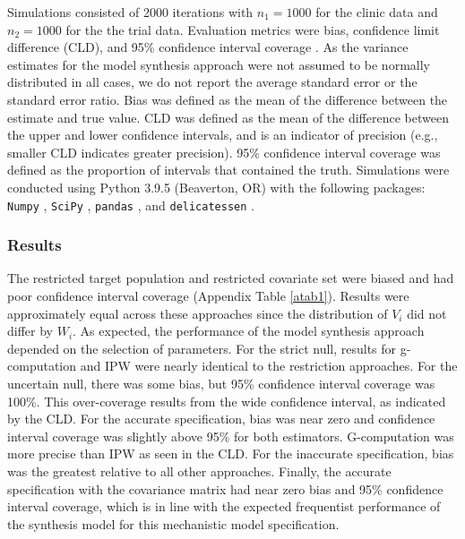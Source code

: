 \documentclass[]{article}
\begin{document}
Simulations consisted of 2000 iterations with $n_1 = 1000$ for the clinic data and $n_2 = 1000$ for the the trial data. Evaluation metrics were bias, confidence limit difference (CLD), and 95\% confidence interval coverage \cite{morris_using_2019}. As the variance estimates for the model synthesis approach were not assumed to be normally distributed in all cases, we do not report the average standard error or the standard error ratio. Bias was defined as the mean of the difference between the estimate and true value. CLD was defined as the mean of the difference between the upper and lower confidence intervals, and is an indicator of precision (e.g., smaller CLD indicates greater precision). 95\% confidence interval coverage was defined as the proportion of intervals that contained the truth. Simulations were conducted using Python 3.9.5 (Beaverton, OR) with the following packages: \texttt{Numpy} \cite{harris_array_2020}, \texttt{SciPy} \cite{virtanen_scipy_2020}, \texttt{pandas} \cite{mckinney_data_2010}, and \texttt{delicatessen} \cite{zivich_delicatessen_2022}.

\subsubsection*{Results}

The restricted target population and restricted covariate set were biased and had poor confidence interval coverage (Appendix Table \ref{atab1}). Results were approximately equal across these approaches since the distribution of $V_i$ did not differ by $W_i$. As expected, the performance of the model synthesis approach depended on the selection of parameters. For the strict null, results for g-computation and IPW were nearly identical to the restriction approaches. For the uncertain null, there was some bias, but 95\% confidence interval coverage was 100\%. This over-coverage results from the wide confidence interval, as indicated by the CLD. For the accurate specification, bias was near zero and confidence interval coverage was slightly above 95\% for both estimators. G-computation was more precise than IPW as seen in the CLD. For the inaccurate specification, bias was the greatest relative to all other approaches. Finally, the accurate specification with the covariance matrix had near zero bias and 95\% confidence interval coverage, which is in line with the expected frequentist performance of the synthesis model for this mechanistic model specification.
\end{document}
